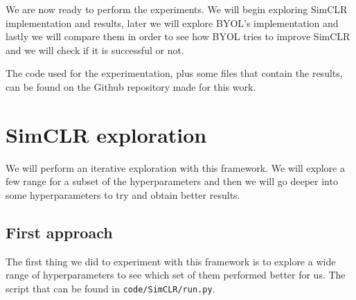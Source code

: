 We are now ready to perform the experiments. We will begin exploring SimCLR implementation and results, later we will explore BYOL's implementation and lastly we will compare them in order to see how BYOL tries to improve SimCLR and we will check if it is successful or not.

The code used for the experimentation, plus some files that contain the results, can be found on the Github repository made for this work.

\section{SimCLR exploration}
We will perform an iterative exploration with this framework. We will explore a few range for a subset of the hyperparameters and then we will go deeper into some hyperparameters to try and obtain better results.

\subsection{First approach}
\label{experiments:simclr:first}

The first thing we did to experiment with this framework is to explore a wide range of hyperparameters to see which set of them performed better for us. The script that can be found in \lstinline{code/SimCLR/run.py}.

